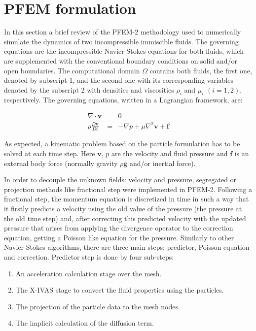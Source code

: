 \documentclass[a4paper,conference]{IEEEtran}
\begin{document}
\section{PFEM formulation}\label{GeneralFor}

In this section a brief review of the PFEM-2 methodology used to numerically simulate the dynamics of two incompressible immiscible fluids. The governing equations are the incompressible Navier-Stokes equations for both fluids, which are supplemented with the conventional boundary conditions on solid and/or open boundaries. The computational domain $\Omega$ contains both fluids, the first one, denoted by subscript 1, and the second one with its corresponding variables denoted by the subscript 2 with densities and viscosities $\rho_i$ and $\mu_i$ $(i=1,2)$, respectively. The governing equations, written in a Lagrangian framework, are:

\begin{eqnarray}
  \nabla \cdot \mathbf{v} &=& 0 \label{eq:continuity} \\
  \rho\frac{D\mathbf{v}}{Dt} &=& -\nabla p + \mu \nabla^2 \mathbf{v} + \mathbf{f}\label{eq:momentum}
\end{eqnarray}

As expected, a kinematic problem based on the particle formulation has to be solved at each time step. Here $\mathbf{v}$, $p$ are the velocity and fluid pressure and $\mathbf{f}$ is an external body force (normally gravity $\rho \mathbf{g}$ and/or inertial force).

In order to decouple the unknown fields: velocity and pressure, segregated or projection methods like fractional step were implemented in PFEM-2. Following a fractional step, the momentum equation is discretized in time in such a way that it firstly predicts a velocity using the old value of the pressure (the pressure at the old time step) and, after correcting this predicted velocity with the updated pressure that arises from applying the divergence operator to the correction equation, getting a Poisson like equation for the pressure.
Similarly to other Navier-Stokes algorithms, there are three main steps: predictor, Poisson equation and correction. Predictor step is done by four sub-steps:

\begin{enumerate}
  \item An acceleration calculation stage over the mesh.
  \item The X-IVAS stage to convect the fluid properties using the particles.
  \item The projection of the particle data to the mesh nodes.
  \item The implicit calculation of the diffusion term.
\end{enumerate}
\end{document}
